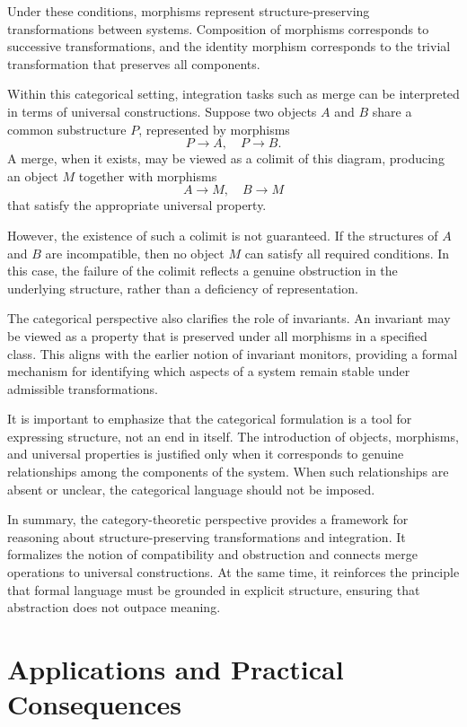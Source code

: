 \documentclass[11pt,oneside]{article}
\begin{document}
Under these conditions, morphisms represent structure-preserving transformations between systems. Composition of morphisms corresponds to successive transformations, and the identity morphism corresponds to the trivial transformation that preserves all components.

Within this categorical setting, integration tasks such as merge can be interpreted in terms of universal constructions. Suppose two objects \( A \) and \( B \) share a common substructure \( P \), represented by morphisms
\[
P \to A, \quad P \to B.
\]
A merge, when it exists, may be viewed as a colimit of this diagram, producing an object \( M \) together with morphisms
\[
A \to M, \quad B \to M
\]
that satisfy the appropriate universal property.

However, the existence of such a colimit is not guaranteed. If the structures of \( A \) and \( B \) are incompatible, then no object \( M \) can satisfy all required conditions. In this case, the failure of the colimit reflects a genuine obstruction in the underlying structure, rather than a deficiency of representation.

The categorical perspective also clarifies the role of invariants. An invariant may be viewed as a property that is preserved under all morphisms in a specified class. This aligns with the earlier notion of invariant monitors, providing a formal mechanism for identifying which aspects of a system remain stable under admissible transformations.

It is important to emphasize that the categorical formulation is a tool for expressing structure, not an end in itself. The introduction of objects, morphisms, and universal properties is justified only when it corresponds to genuine relationships among the components of the system. When such relationships are absent or unclear, the categorical language should not be imposed.

In summary, the category-theoretic perspective provides a framework for reasoning about structure-preserving transformations and integration. It formalizes the notion of compatibility and obstruction and connects merge operations to universal constructions. At the same time, it reinforces the principle that formal language must be grounded in explicit structure, ensuring that abstraction does not outpace meaning.

\section{Applications and Practical Consequences}
\end{document}
